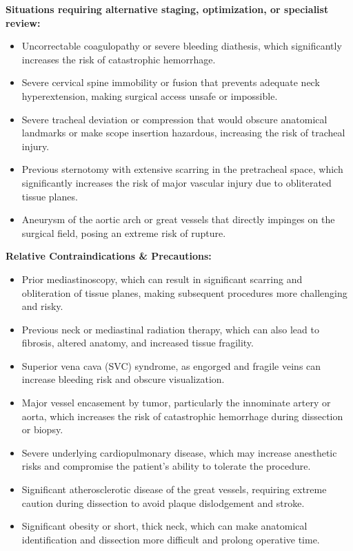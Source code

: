 \textbf{Situations requiring alternative staging, optimization, or specialist review:}
\begin{itemize}
  \item Uncorrectable coagulopathy or severe bleeding diathesis, which significantly increases the risk of catastrophic hemorrhage.
  \item Severe cervical spine immobility or fusion that prevents adequate neck hyperextension, making surgical access unsafe or impossible.
  \item Severe tracheal deviation or compression that would obscure anatomical landmarks or make scope insertion hazardous, increasing the risk of tracheal injury.
  \item Previous sternotomy with extensive scarring in the pretracheal space, which significantly increases the risk of major vascular injury due to obliterated tissue planes.
  \item Aneurysm of the aortic arch or great vessels that directly impinges on the surgical field, posing an extreme risk of rupture.
\end{itemize}

\textbf{Relative Contraindications \& Precautions:}
\begin{itemize}
  \item Prior mediastinoscopy, which can result in significant scarring and obliteration of tissue planes, making subsequent procedures more challenging and risky.
  \item Previous neck or mediastinal radiation therapy, which can also lead to fibrosis, altered anatomy, and increased tissue fragility.
  \item Superior vena cava (SVC) syndrome, as engorged and fragile veins can increase bleeding risk and obscure visualization.
  \item Major vessel encasement by tumor, particularly the innominate artery or aorta, which increases the risk of catastrophic hemorrhage during dissection or biopsy.
  \item Severe underlying cardiopulmonary disease, which may increase anesthetic risks and compromise the patient's ability to tolerate the procedure.
  \item Significant atherosclerotic disease of the great vessels, requiring extreme caution during dissection to avoid plaque dislodgement and stroke.
  \item Significant obesity or short, thick neck, which can make anatomical identification and dissection more difficult and prolong operative time.
\end{itemize}

